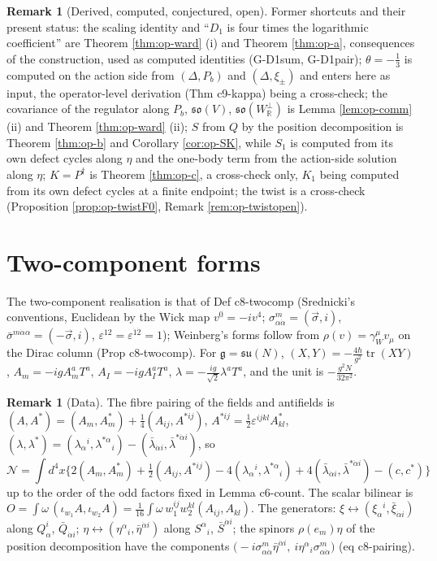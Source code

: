 \documentclass[11pt]{article}
\numberwithin{equation}{section}
\theoremstyle{plain}
\theoremstyle{definition}
\newtheorem{remark}[theorem]{Remark}
\newcommand{\Fc}{\mathcal N}
\begin{document}
\begin{remark}[Derived, computed, conjectured, open]
Former shortcuts and their present status: the scaling identity and ``$D_1$ is four times the logarithmic coefficient'' are Theorem \ref{thm:op-ward} (i) and Theorem \ref{thm:op-a}, consequences of the construction, used as computed identities (G-D1sum, G-D1pair); $\theta=-\tfrac13$ is computed on the action side from $(\Delta,P_b)$ and $(\Delta,\xi_\pm)$ and enters here as input, the operator-level derivation (Thm c9-kappa) being a cross-check; the covariance of the regulator along $P_b$, $\mathfrak{so}(V)$, $\mathfrak{so}(W_{\mathbb R}^\perp)$ is Lemma \ref{lem:op-comm} (ii) and Theorem \ref{thm:op-ward} (ii); $S$ from $Q$ by the position decomposition is Theorem \ref{thm:op-b} and Corollary \ref{cor:op-SK}, while $S_1$ is computed from its own defect cycles along $\eta$ and the one-body term from the action-side solution along $\eta$; $K=P^\dagger$ is Theorem \ref{thm:op-c}, a cross-check only, $K_1$ being computed from its own defect cycles at a finite endpoint; the twist is a cross-check (Proposition \ref{prop:op-twistF0}, Remark \ref{rem:op-twistopen}).
\end{remark}

\section{Two-component forms}
\label{sec:op-twocomp}

The two-component realisation is that of Def c8-twocomp (Srednicki's conventions, Euclidean by the Wick map $v^0=-iv^4$; $\sigma^m_{\alpha\dot\alpha}=(\vec\sigma,i)$, $\bar\sigma^{m\dot\alpha\alpha}=(-\vec\sigma,i)$, $\varepsilon^{12}=\varepsilon^{\dot1\dot2}=1$); Weinberg's forms follow from $\rho(v)=\gamma_W^\mu v_\mu$ on the Dirac column (Prop c8-twocomp). For $\mathfrak g=\mathfrak{su}(N)$, $(X,Y)=-\tfrac{4\hbar}{g^2}\operatorname{tr}(XY)$, $A_m=-igA^a_mT^a$, $A_I=-igA^a_IT^a$, $\lambda=-\tfrac{ig}{\sqrt2}\lambda^aT^a$, and the unit is $-\tfrac{g^2N}{32\pi^2}$.

\begin{remark}[Data]
\label{rem:op-tc-data}
The fibre pairing of the fields and antifields is $(A,A^*)=(A_m,A^*_m)+\tfrac14(A_{ij},A^{*ij})$, $A^{*ij}=\tfrac12\varepsilon^{ijkl}A^*_{kl}$, $(\lambda,\lambda^*)=(\lambda_\alpha{}^i,\lambda^{*\alpha}{}_i)-(\bar\lambda_{\dot\alpha i},\bar\lambda^{*\dot\alpha i})$, so
\[
\Fc=\int d^4x\Big\{2(A_m,A^*_m)+\tfrac12(A_{ij},A^{*ij})-4(\lambda_\alpha{}^i,\lambda^{*\alpha}{}_i)+4(\bar\lambda_{\dot\alpha i},\bar\lambda^{*\dot\alpha i})-(c,c^*)\Big\}
\]
up to the order of the odd factors fixed in Lemma c6-count. The scalar bilinear is $O=\int\omega\,(\iota_{w_1}A,\iota_{w_2}A)=\tfrac1{16}\int\omega\,w_1^{ij}w_2^{kl}(A_{ij},A_{kl})$. The generators: $\xi\leftrightarrow(\xi_\alpha{}^i,\bar\xi_{\dot\alpha i})$ along $Q^i_\alpha$, $\bar Q_{\dot\alpha i}$; $\eta\leftrightarrow(\eta^\alpha{}_i,\bar\eta^{\dot\alpha i})$ along $S^\alpha{}_i$, $\bar S^{\dot\alpha i}$; the spinors $\rho(e_m)\eta$ of the position decomposition have the components $\big(-i\sigma^m_{\alpha\dot\alpha}\bar\eta^{\dot\alpha i},\ i\eta^\alpha{}_i\sigma^m_{\alpha\dot\alpha}\big)$ (eq c8-pairing).
\end{remark}
\end{document}
